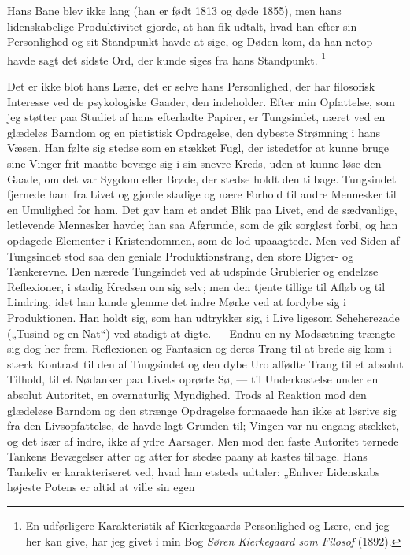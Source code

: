 \documentclass[12pt,a4paper,openany]{book}
\newcommand{\opage}[1]{\marginnote{\footnotesize\textit{[#1]}}}
\begin{document}
Hans Bane blev ikke lang (han er født 1813 og døde 1855), men hans
lidenskabelige Produktivitet gjorde, at han fik udtalt, hvad han efter sin
Personlighed og sit Standpunkt havde at sige, og Døden kom, da han netop havde
sagt det sidste Ord, der kunde siges fra hans Standpunkt.%
\footnote[1]{En udførligere Karakteristik af Kierkegaards Personlighed og Lære,
end jeg her kan give, har jeg givet i min Bog \textit{Søren Kierkegaard som
Filosof} (1892).}

Det er ikke blot hans Lære, det er selve hans Personlighed, der har filosofisk
Interesse ved de psykologiske Gaader, den indeholder. Efter min Opfattelse, som
jeg støtter paa
\setcounter{footnote}{0}%
\opage{149}Studiet af hans efterladte Papirer, er Tungsindet, næret ved en
glædeløs Barndom og en pietistisk Opdragelse, den dybeste Strømning i hans
Væsen. Han følte sig stedse som en stækket Fugl, der istedetfor at kunne bruge
sine Vinger frit maatte bevæge sig i sin snevre Kreds, uden at kunne løse den
Gaade, om det var Sygdom eller Brøde, der stedse holdt den tilbage. Tungsindet
fjernede ham fra Livet og gjorde stadige og nære Forhold til andre Mennesker
til en Umulighed for ham. Det gav ham et andet Blik paa Livet, end de
sædvanlige, letlevende Mennesker havde; han saa Afgrunde, som de gik sorgløst
forbi, og han opdagede Elementer i Kristendommen, som de lod upaaagtede. Men
ved Siden af Tungsindet stod saa den geniale Produktionstrang, den store
Digter- og Tænkerevne. Den nærede Tungsindet ved at udspinde Grublerier og
endeløse Reflexioner, i stadig Kredsen om sig selv; men den tjente tillige til
Afløb og til Lindring, idet han kunde glemme det indre Mørke ved at fordybe sig
i Produktionen. Han holdt sig, som han udtrykker sig, i Live ligesom
Scheherezade („Tusind og en Nat“) ved stadigt at digte. --- Endnu en ny
Modsætning trængte sig dog her frem. Reflexionen og Fantasien og deres Trang
til at brede sig kom i stærk Kontrast til den af Tungsindet og den dybe Uro
affødte Trang til et absolut Tilhold, til et Nødanker paa Livets oprørte Sø,
--- til Underkastelse under en absolut Autoritet, en overnaturlig Myndighed.
Trods al Reaktion mod den glædeløse Barndom og den strænge Opdragelse formaaede
han ikke at løsrive sig fra den Livsopfattelse, de havde lagt Grunden til;
Vingen var nu engang stækket, og det især af indre, ikke af ydre Aarsager. Men
mod den faste Autoritet tørnede Tankens Bevægelser atter og atter for stedse
paany at kastes tilbage. Hans Tankeliv er karakteriseret ved, hvad han etsteds
udtaler: „Enhver Lidenskabs højeste Potens er altid at ville sin egen
\end{document}

